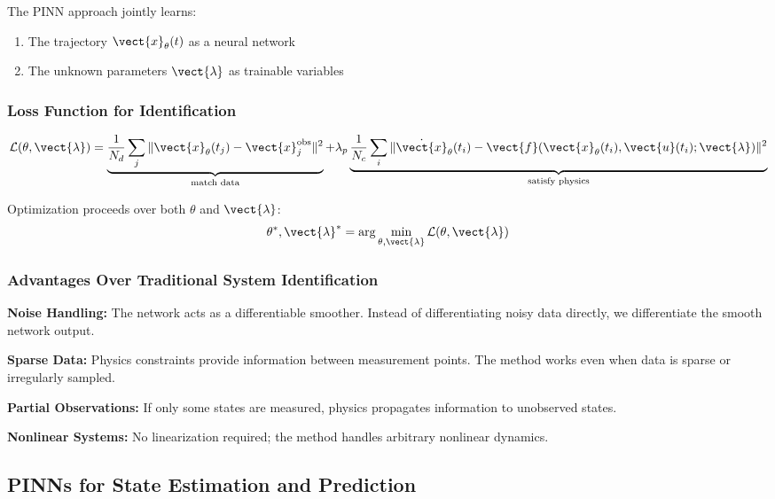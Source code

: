 The PINN approach jointly learns:
\begin{enumerate}
    \item The trajectory $\vect{x}_\theta(t)$ as a neural network
    \item The unknown parameters $\vect{\lambda}$ as trainable variables
\end{enumerate}

\subsubsection{Loss Function for Identification}

\begin{equation}
\mathcal{L}(\theta, \vect{\lambda}) = \underbrace{\frac{1}{N_d}\sum_j \|\vect{x}_\theta(t_j) - \vect{x}_j^{\text{obs}}\|^2}_{\text{match data}} + \lambda_p \underbrace{\frac{1}{N_c}\sum_i \|\dot{\vect{x}}_\theta(t_i) - \vect{f}(\vect{x}_\theta(t_i), \vect{u}(t_i); \vect{\lambda})\|^2}_{\text{satisfy physics}}
\label{eq:pinn_sysid_loss}
\end{equation}

Optimization proceeds over both $\theta$ and $\vect{\lambda}$:
\begin{equation}
\theta^*, \vect{\lambda}^* = \arg\min_{\theta, \vect{\lambda}} \mathcal{L}(\theta, \vect{\lambda})
\end{equation}

\subsubsection{Advantages Over Traditional System Identification}

\textbf{Noise Handling:} The network acts as a differentiable smoother. Instead of differentiating noisy data directly, we differentiate the smooth network output.

\textbf{Sparse Data:} Physics constraints provide information between measurement points. The method works even when data is sparse or irregularly sampled.

\textbf{Partial Observations:} If only some states are measured, physics propagates information to unobserved states.

\textbf{Nonlinear Systems:} No linearization required; the method handles arbitrary nonlinear dynamics.

\subsection{PINNs for State Estimation and Prediction}

